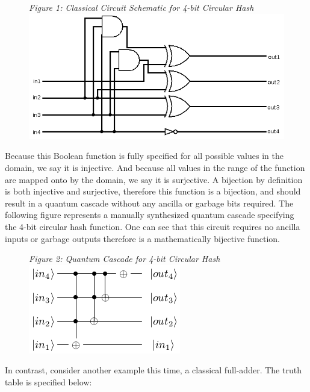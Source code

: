 \documentclass{IEEEtran}
\begin{document}
\begin{figure}[h!]
\begin{center}
\textit{\small{Figure 1: Classical Circuit Schematic for 4-bit Circular Hash}}
  \includegraphics[scale=0.35]{figures/fbch.png}
\end{center}
\end{figure}

Because this Boolean function is fully specified for all possible values in the domain, we say it is injective. And because all values in the range of the function are mapped onto by the domain, we say it is surjective. A bijection by definition is both injective and surjective, therefore this function is a bijection, and should result in a quantum cascade without any ancilla or garbage bits required. The following figure represents a manually synthesized quantum cascade specifying the 4-bit circular hash function. 
One can see that this circuit requires no ancilla inputs or garbage outputs therefore is a mathematically bijective function. 

\begin{figure}[h!]
\begin{center}
\textit{\small{Figure 2: Quantum Cascade for 4-bit Circular Hash}} 
  \includegraphics[scale=0.6]{figures/4-bit_circular_hash_qc.png}
\end{center}
\end{figure}

In contrast, consider another example this time, a classical full-adder. The truth table is specified below: 
\end{document}
